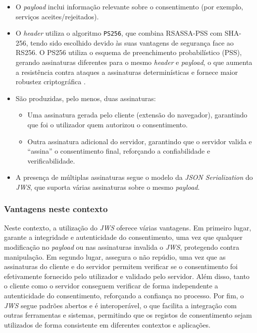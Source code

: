 \begin{itemize}
  \item O \textit{payload} inclui informação relevante sobre o consentimento (por exemplo, serviços aceites/rejeitados).
  \item O \textit{header} utiliza o algoritmo \texttt{PS256}, que combina RSASSA-PSS com SHA-256, tendo sido escolhido devido às suas vantagens de segurança face ao RS256. O PS256 utiliza o esquema de preenchimento probabilístico (PSS), gerando assinaturas diferentes para o mesmo \textit{header} e \textit{payload}, o que aumenta a resistência contra ataques a assinaturas determinísticas e fornece maior robustez criptográfica \citep{ScottBrady2020}.
  \item São produzidas, pelo menos, duas assinaturas:
    \begin{itemize}
      \item Uma assinatura gerada pelo cliente (extensão do navegador), garantindo que foi o utilizador quem autorizou o consentimento.
      \item Outra assinatura adicional do servidor, garantindo que o servidor valida e “assina” o consentimento final, reforçando a confiabilidade e verificabilidade.
    \end{itemize}
\item A presença de múltiplas assinaturas segue o modelo da \textit{JSON Serialization} do \textit{JWS}, que suporta várias assinaturas sobre o mesmo \textit{payload}.
\end{itemize}

\subsubsection{Vantagens neste contexto}

Neste contexto, a utilização do \textit{JWS} oferece várias vantagens. Em primeiro lugar, garante a integridade e autenticidade do consentimento, uma vez que qualquer modificação no \textit{payload} ou nas assinaturas invalida o \textit{JWS}, protegendo contra manipulação. 
Em segundo lugar, assegura o não repúdio, uma vez que as assinaturas do cliente e do servidor permitem verificar se o consentimento foi efetivamente fornecido pelo utilizador e validado pelo servidor.
Além disso, tanto o cliente como o servidor conseguem verificar de forma independente a autenticidade do consentimento, reforçando a confiança no processo.
Por fim, o \textit{JWS} segue padrões abertos e é interoperável, o que facilita a integração com outras ferramentas e sistemas, permitindo que os registos de consentimento sejam utilizados de forma consistente em diferentes contextos e aplicações.

